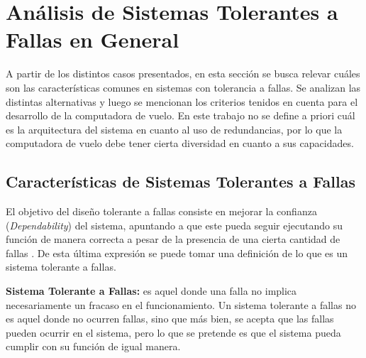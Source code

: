 \section{Análisis de Sistemas Tolerantes a Fallas en General}\label{sec:requerimentos_sistema_tolerancia_fallas}




A partir de los distintos casos presentados, en esta sección se busca relevar cuáles son las características comunes en sistemas con tolerancia a fallas. Se analizan las distintas alternativas y luego se mencionan los criterios tenidos en cuenta para el desarrollo de la computadora de vuelo. En este trabajo no se define a priori cuál es la arquitectura del sistema en cuanto al uso de redundancias, por lo que la computadora de vuelo debe tener cierta diversidad en cuanto a sus capacidades.

\subsection{Características de Sistemas Tolerantes a Fallas}

El objetivo del diseño tolerante a fallas consiste en mejorar la confianza (\textit{Dependability}) del sistema, apuntando a que este pueda seguir ejecutando su función de manera correcta a pesar de la presencia de una cierta cantidad de fallas \cite{nelson1990fault}. De esta última expresión se puede tomar una definición de lo que es un sistema tolerante a fallas.

\begin{mydef}
    \textbf{Sistema Tolerante a Fallas:} es aquel donde una falla no implica necesariamente un fracaso en el funcionamiento. Un sistema tolerante a fallas no es aquel donde no ocurren fallas, sino que más bien, se acepta que las fallas pueden ocurrir en el sistema, pero lo que se pretende es que el sistema pueda cumplir con su función de igual manera.
\end{mydef}

